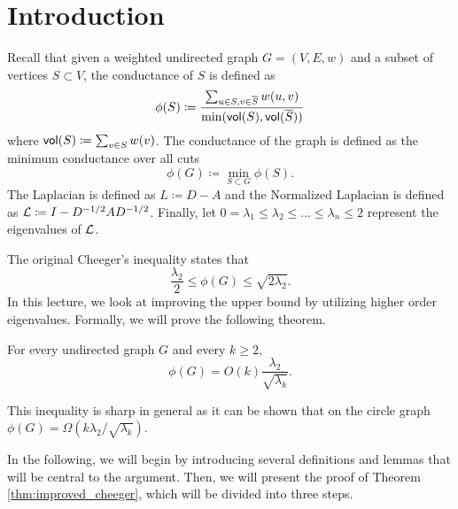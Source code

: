 \documentclass[11pt]{article}
\begin{document}
\newcommand{\coursenum}{{CSC 2240H}}
\newcommand{\coursename}{{Graphs, Matrices, and Optimization}}
\newcommand{\courseprof}{Sushant Sachdeva}


\section{Introduction}
Recall that given a weighted undirected graph $G = (V, E, w)$ and a subset of vertices $S \subset V$, the conductance of $S$ is defined as
\begin{equation}
    \phi(S) \coloneqq \frac{\sum_{u \in S, v \in \overline{S}} w(u, v)}{\min(\operatorname{\mathsf{vol}}(S),\operatorname{\mathsf{vol}}(\overline{S}))}
\end{equation}
where $\operatorname{\mathsf{vol}}(S) \coloneqq \sum_{v \in S} w(v)$.
The conductance of the graph is defined as the minimum conductance over all cuts 
\begin{equation}
    \phi(G) \coloneqq \min_{S \subset G} \phi(S).
\end{equation}
The Laplacian is defined as $L \coloneqq D - A$ and the Normalized Laplacian is defined as $\mathcal{L} \coloneqq I - D^{-1/2}AD^{-1/2}$. Finally, let $0 = \lambda_1 \leq \lambda_2 \leq ... \leq \lambda_n \leq 2$ represent the eigenvalues of $\mathcal{L}$. 

The original Cheeger's inequality states that
\begin{equation}
    \frac{\lambda_2}{2} \leq \phi(G) \leq \sqrt{2\lambda_2}.
\end{equation}
In this lecture, we look at improving the upper bound by utilizing higher order eigenvalues. Formally, we will prove the following theorem.
\begin{theorem}\label{thm:improved_cheeger}
    For every undirected graph $G$ and every $k \geq 2$,
    \begin{equation}\label{eq:improved_cheeger}
    \phi(G) = O(k) \frac{\lambda_2}{\sqrt{\lambda_k}}.
\end{equation}
\end{theorem}
This inequality is sharp in general as it can be shown that on the circle graph $\phi(G) = \Omega(k\lambda_2/\sqrt{\lambda_k})$.

In the following, we will begin by introducing several definitions and lemmas that will be central to the argument. Then, we will present the proof of Theorem \ref{thm:improved_cheeger}, which will be divided into three steps. 
\end{document}
